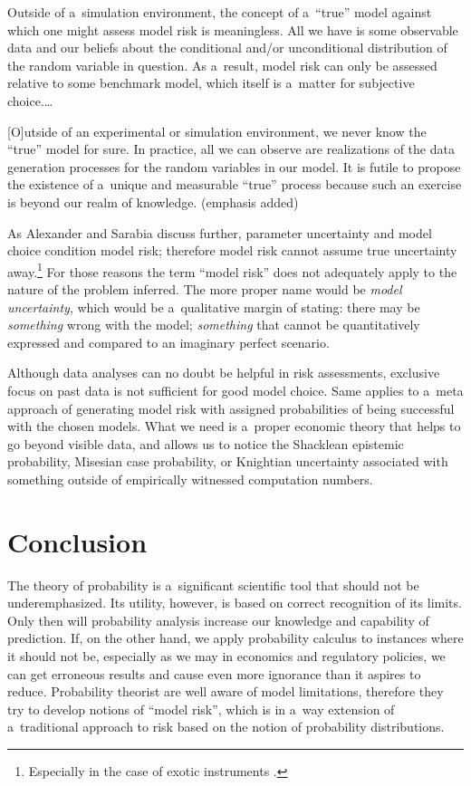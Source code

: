Outside of a~simulation environment, the concept of a~``true'' model against which one might assess model risk is meaningless. All we have is some observable data and our beliefs about the conditional and/or unconditional distribution of the random variable in question. As a~result, model risk can only be assessed relative to some benchmark model, which itself is a~matter for subjective choice.…



[O]utside of an experimental or simulation environment, we never know the ``true'' model for sure. In practice, all we can observe are realizations of the data generation processes for the random variables in our model. It is futile to propose the existence of a~unique and measurable ``true'' process because such an exercise is beyond our realm of knowledge. (emphasis added)



As Alexander and Sarabia discuss further, parameter uncertainty and model choice condition model risk; therefore model risk cannot assume true uncertainty away.\footnote{Especially in the case of exotic instruments 
\parencite[][p.298]{hull_methodology_2002}.%
} For those reasons the term ``model risk'' does not adequately apply to the nature of the problem inferred. The more proper name would be \textit{model uncertainty}, which would be a~qualitative margin of stating: there may be \textit{something} wrong with the model; \textit{something} that cannot be quantitatively expressed and compared to an imaginary perfect scenario.



Although data analyses can no doubt be helpful in risk assessments, exclusive focus on past data is not sufficient for good model choice. Same applies to a~meta approach of generating model risk with assigned probabilities of being successful with the chosen models. What we need is a~proper economic theory that helps to go beyond visible data, and allows us to notice the Shacklean epistemic probability, Misesian case probability, or Knightian uncertainty associated with something outside of empirically witnessed computation numbers.



\section{Conclusion}

The theory of probability is a~significant scientific tool that should not be underemphasized. Its utility, however, is based on correct recognition of its limits. Only then will probability analysis increase our knowledge and capability of prediction. If, on the other hand, we apply probability calculus to instances where it should not be, especially as we may in economics and regulatory policies, we can get erroneous results and cause even more ignorance than it aspires to reduce. Probability theorist are well aware of model limitations, therefore they try to develop notions of ``model risk'', which is in a~way extension of a~traditional approach to risk based on the notion of probability distributions.



